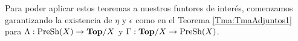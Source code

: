 Para poder aplicar estos teoremas a nuestros funtores de interés, comenzamos garantizando la existencia de $\eta$ y $\epsilon$ como en el Teorema \ref{Tma:TmaAdjuntos1} para $\Lambda:\normalfont{\text{PreSh}}(X)\to\normalfont{\textbf{Top}}/X$ y $\Gamma:\normalfont{\textbf{Top}}/X\to\normalfont{\text{PreSh}}(X)$.

   


   


   
